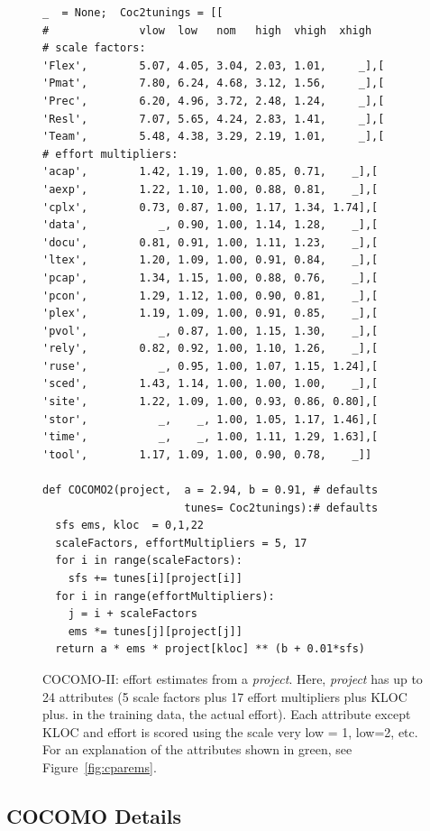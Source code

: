 \documentclass[final,twocolumn]{elsarticle}
\newcommand{\fig}[1]{Figure~\ref{fig:#1}}
\theoremstyle{break}
\begin{document}
 \begin{figure}[!t]
\begin{lstlisting}
_  = None;  Coc2tunings = [[
#              vlow  low   nom   high  vhigh  xhigh   
# scale factors:
'Flex',        5.07, 4.05, 3.04, 2.03, 1.01,     _],[
'Pmat',        7.80, 6.24, 4.68, 3.12, 1.56,     _],[
'Prec',        6.20, 4.96, 3.72, 2.48, 1.24,     _],[
'Resl',        7.07, 5.65, 4.24, 2.83, 1.41,     _],[
'Team',        5.48, 4.38, 3.29, 2.19, 1.01,     _],[
# effort multipliers:        
'acap',        1.42, 1.19, 1.00, 0.85, 0.71,    _],[
'aexp',        1.22, 1.10, 1.00, 0.88, 0.81,    _],[
'cplx',        0.73, 0.87, 1.00, 1.17, 1.34, 1.74],[
'data',           _, 0.90, 1.00, 1.14, 1.28,    _],[
'docu',        0.81, 0.91, 1.00, 1.11, 1.23,    _],[
'ltex',        1.20, 1.09, 1.00, 0.91, 0.84,    _],[
'pcap',        1.34, 1.15, 1.00, 0.88, 0.76,    _],[ 
'pcon',        1.29, 1.12, 1.00, 0.90, 0.81,    _],[
'plex',        1.19, 1.09, 1.00, 0.91, 0.85,    _],[ 
'pvol',           _, 0.87, 1.00, 1.15, 1.30,    _],[
'rely',        0.82, 0.92, 1.00, 1.10, 1.26,    _],[
'ruse',           _, 0.95, 1.00, 1.07, 1.15, 1.24],[
'sced',        1.43, 1.14, 1.00, 1.00, 1.00,    _],[ 
'site',        1.22, 1.09, 1.00, 0.93, 0.86, 0.80],[ 
'stor',           _,    _, 1.00, 1.05, 1.17, 1.46],[
'time',           _,    _, 1.00, 1.11, 1.29, 1.63],[
'tool',        1.17, 1.09, 1.00, 0.90, 0.78,    _]]

def COCOMO2(project,  a = 2.94, b = 0.91, # defaults
                      tunes= Coc2tunings):# defaults 
  sfs ems, kloc  = 0,1,22          
  scaleFactors, effortMultipliers = 5, 17
  for i in range(scaleFactors):
    sfs += tunes[i][project[i]]
  for i in range(effortMultipliers):
    j = i + scaleFactors
    ems *= tunes[j][project[j]] 
  return a * ems * project[kloc] ** (b + 0.01*sfs) 
\end{lstlisting}
\caption{COCOMO-II: effort estimates from a {\em project}.
Here, {\em project} has up to 24 attributes  (5 scale
factors plus 17 effort multipliers plus KLOC plus. in the training data, the actual effort).
Each attribute except KLOC and effort is scored
using the scale very low = 1, low=2, etc.
For an explanation of the attributes shown in
green, see \fig{cparems}.}\label{fig:coc2}
\end{figure}

 

  \subsection{COCOMO Details}
\end{document}
